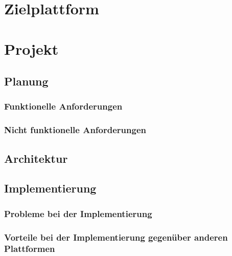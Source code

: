 \documentclass[12pt,listof=totoc,bibliography=totoc]{scrbook}
\begin{document}
\chapter{Zielplattform}

\chapter{Projekt}

\section{Planung}
\subsection{Funktionelle Anforderungen}
\subsection{Nicht funktionelle Anforderungen}

\section{Architektur}

\section{Implementierung}
\subsection{Probleme bei der Implementierung}
\subsection{Vorteile bei der Implementierung gegenüber anderen Plattformen}
	
\end{document}

